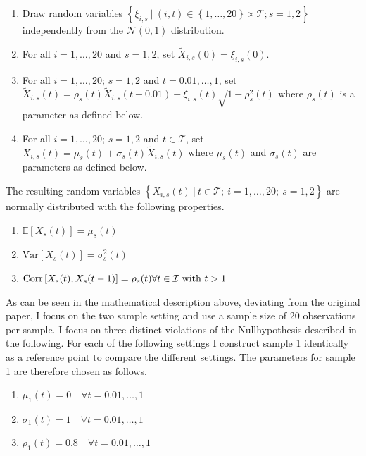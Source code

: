 \documentclass[12pt, a4paper]{article}
\theoremstyle{MAstyle} \newtheorem{assumption}{Assumption}[section]
\theoremstyle{MAstyle} \newtheorem{definition}{Definition}[section]
\begin{document}
		\begin{enumerate}
			\item Draw random variables $\left\{\xi_{i,s} \ \vert \ (i,t) \in \left\{1, \dots, 20\right\} \times \mathcal{T} ; s = 1,2 \right\}$ independently from the $\mathcal{N}(0,1)$ distribution.
			\item For all $i = 1, \dots, 20$ and $s = 1,2$, set $\tilde{X}_{i,s}(0) = \xi_{i,s}(0)$.
			\item For all $i = 1, \dots, 20$; $s = 1,2$ and $t = 0.01, \dots, 1$, set $\tilde{X}_{i,s}(t) = \rho_{s}(t)\tilde{X}_{i,s}(t-0.01) + \xi_{i,s}(t)\sqrt{1-\rho_s^2(t)}$ where $\rho_{s}(t)$ is a parameter as defined below.
			\item For all $i = 1, \dots, 20$; $s = 1,2$ and $t \in \mathcal{T}$, set $X_{i,s}(t) = \mu_s(t) + \sigma_s(t)\tilde{X}_{i,s}(t)$ where $\mu_s(t)$ and $\sigma_s(t)$ are parameters as defined below.
		\end{enumerate}
		The resulting random variables $\left\{X_{i,s}(t) \ \vert \ t \in \mathcal{T}; \ i = 1, \dots, 20; \ s = 1,2\right\}$ are normally distributed with the following properties.
		\begin{multicols}{2}
			\begin{enumerate}
				\item $\mathbb{E}\left[X_s(t)\right] = \mu_s(t)$
				\item $\text{Var}\left[X_s(t)\right] = \sigma^2_s(t)$
				\item $\text{Corr}\left[X_s(t), X_s(t-1)\right] = \rho_s(t) \\ \forall t \in \mathcal{I} \ \text{with} \ t > 1$
			\end{enumerate}
		\end{multicols}
		As can be seen in the mathematical description above, deviating from the original paper, I focus on the two sample setting and use a sample size of 20 observations per sample. I focus on three distinct violations of the Nullhypothesis described in the following. For each of the following settings I construct sample 1 identically as a reference point to compare the different settings. The parameters for sample 1 are therefore chosen as follows.
		\begin{multicols}{2}
			\begin{enumerate}
				\item $\mu_1(t) = 0 \quad \forall t = 0.01, \dots, 1$
				\item $\sigma_1(t) = 1 \quad \forall t = 0.01, \dots, 1$
				\item $ \rho_1(t) = 0.8 \quad \forall t = 0.01, \dots, 1$
			\end{enumerate}
		\end{multicols}
\end{document}
